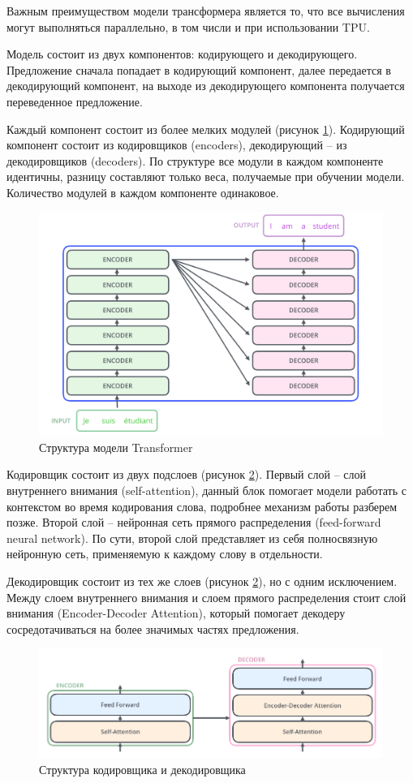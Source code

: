 \documentclass[a4paper,14pt]{article}
\begin{document}
Важным преимуществом модели трансформера является то, что все вычисления могут выполняться параллельно, в том числи и при использовании TPU.

Модель состоит из двух компонентов: кодирующего и декодирующего.
Предложение сначала попадает в кодирующий компонент, далее передается в декодирующий компонент, на выходе из декодирующего компонента получается переведенное предложение.

Каждый компонент состоит из более мелких модулей (рисунок \ref{fig:bertgroups}).
Кодирующий компонент состоит из кодировщиков (encoders), декодирующий -- из декодировщиков (decoders).
По структуре все модули в каждом компоненте идентичны, разницу составляют только веса, получаемые при обучении модели.
Количество модулей в каждом компоненте одинаковое.

\begin{figure}[H]
	\centering
	\includegraphics[width=0.6\linewidth]{image/bert_groups}
	\caption{Структура модели Transformer}
	\label{fig:bertgroups}
\end{figure}


Кодировщик состоит из двух подслоев (рисунок \ref{fig:bertencdec}).
Первый слой -- слой внутреннего внимания (self-attention), данный блок помогает модели работать с контекстом во время кодирования слова, подробнее механизм работы разберем позже.
Второй слой -- нейронная сеть прямого распределения (feed-forward neural network).
По сути, второй слой представляет из себя полносвязную нейронную сеть, применяемую к каждому слову в отдельности.

Декодировщик состоит из тех же слоев (рисунок \ref{fig:bertencdec}), но с одним исключением.
Между слоем внутреннего внимания и слоем прямого распределения стоит слой внимания (Encoder-Decoder Attention), который помогает декодеру 	сосредотачиваться на более значимых частях предложения.

\begin{figure}[H]
	\centering
	\includegraphics[width=0.8\linewidth]{image/bert_enc_dec}
	\caption{Структура кодировщика и декодировщика}
	\label{fig:bertencdec}
\end{figure}
\end{document}
